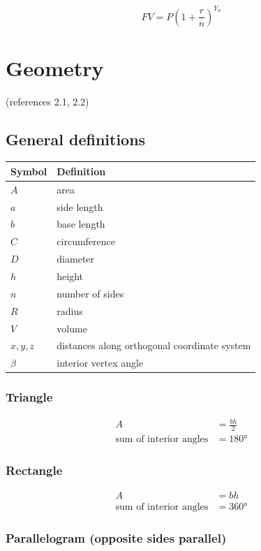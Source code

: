 \documentclass[
]{book}
\begin{document}
\[FV   =   P (1  +  \frac{r}{n})^{Y_n}\]

\hypertarget{geometry}{%
\section{Geometry}\label{geometry}}

(references 2.1, 2.2)

\hypertarget{general-definitions}{%
\subsection*{General definitions}\label{general-definitions}}

\begin{longtable}[]{@{}ll@{}}
\toprule
Symbol & Definition\tabularnewline
\midrule
\endhead
\(A\) & area\tabularnewline
\(a\) & side length\tabularnewline
\(b\) & base length\tabularnewline
\(C\) & circumference\tabularnewline
\(D\) & diameter\tabularnewline
\(h\) & height\tabularnewline
\(n\) & number of sides\tabularnewline
\(R\) & radius\tabularnewline
\(V\) & volume\tabularnewline
\(x, y, z\) & distances along orthogonal coordinate system\tabularnewline
\(\beta\) & interior vertex angle\tabularnewline
\bottomrule
\end{longtable}

\hypertarget{triangle}{%
\subsubsection*{Triangle}\label{triangle}}

\begin{align}
A &= \frac{bh}{2}\\
\text{sum of interior angles} &= 180°
\end{align}

\hypertarget{rectangle}{%
\subsubsection*{Rectangle}\label{rectangle}}

\begin{align}
A &= bh\\
\text{sum of interior angles} &= 360°
\end{align}

\hypertarget{parallelogram-opposite-sides-parallel}{%
\subsubsection*{Parallelogram (opposite sides parallel)}\label{parallelogram-opposite-sides-parallel}}
\end{document}

